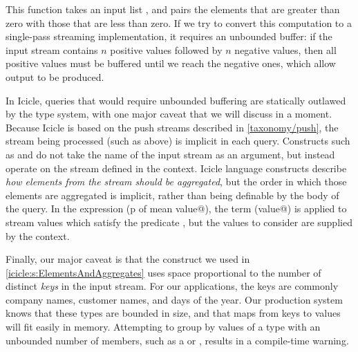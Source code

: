 This function takes an input list \Ic@xs@, and pairs the elements that are greater than zero with those that are less than zero.
If we try to convert this computation to a single-pass streaming implementation, it requires an unbounded buffer: if the input stream contains $n$ positive values followed by $n$ negative values, then all positive values must be buffered until we reach the negative ones, which allow output to be produced.


In Icicle, queries that would require unbounded buffering are statically outlawed by the type system, with one major caveat that we will discuss in a moment.
Because Icicle is based on the push streams described in \cref{taxonomy/push}, the stream being processed (such as \Ic@xs@ above) is implicit in each query.
Constructs such as \Ic@filter@ and \Ic@fold@ do not take the name of the input stream as an argument, but instead operate on the stream defined in the context.
Icicle language constructs describe \emph{how elements from the stream should be aggregated}, but the order in which those elements are aggregated is implicit, rather than being definable by the body of the query.
In the expression (\Ic@filter p of mean value@), the term (\Ic@mean value@) is applied to stream values which satisfy the predicate \Ic@p@, but the values to consider are supplied by the context.

Finally, our major caveat is that the \Ic@group@ construct we used in \cref{icicle:s:ElementsAndAggregates} uses space proportional to the number of distinct \emph{keys} in the input stream.
For our applications, the keys are commonly company names, customer names, and days of the year.
Our production system knows that these types are bounded in size, and that maps from keys to values will fit easily in memory.
Attempting to group by values of a type with an unbounded number of members, such as a \Ic@Real@ or \Ic@String@, results in a compile-time warning.


